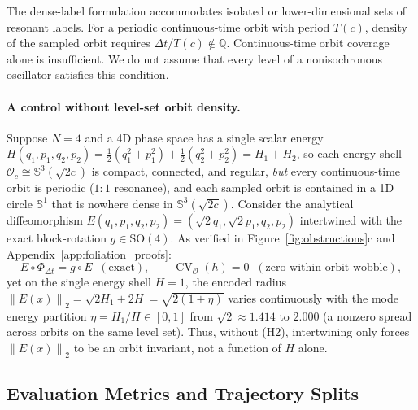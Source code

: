 \documentclass[10pt]{article}
\theoremstyle{definition}
\theoremstyle{remark}
\newcommand{\Sp}{\mathbb{S}}
\newcommand{\norm}[1]{\left\lVert #1 \right\rVert}
\DeclareMathOperator{\CV}{CV}
\begin{document}
The dense-label formulation accommodates isolated or lower-dimensional sets of resonant labels. For a periodic continuous-time orbit with period $T(c)$, density of the sampled orbit requires $\Delta t/T(c)\notin\mathbb Q$. Continuous-time orbit coverage alone is insufficient. We do not assume that every level of a nonisochronous oscillator satisfies this condition.

\paragraph{A control without level-set orbit density.}
Suppose $N = 4$ and a 4D phase space has a single scalar energy $H(q_1, p_1, q_2, p_2) = \frac{1}{2}(q_1^2 + p_1^2) + \frac{1}{2}(q_2^2 + p_2^2) = H_1 + H_2$, so each energy shell $\mathcal{O}_c \cong \Sp^3(\sqrt{2c})$ is compact, connected, and regular, \emph{but} every continuous-time orbit is periodic ($1:1$ resonance), and each sampled orbit is contained in a 1D circle $\Sp^1$ that is nowhere dense in $\Sp^3(\sqrt{2c})$. Consider the analytical diffeomorphism $E(q_1, p_1, q_2, p_2) = (\sqrt{2}q_1, \sqrt{2}p_1, q_2, p_2)$ intertwined with the exact block-rotation $g \in \mathrm{SO}(4)$. As verified in Figure~\ref{fig:obstructions}c and Appendix~\ref{app:foliation_proofs}:
\begin{equation}
    E \circ \Phi_{\Delta t} = g \circ E \;\; (\text{exact}), \qquad \CV_{\mathcal{O}}(h) = 0 \;\; (\text{zero within-orbit wobble}),
\end{equation}
yet on the single energy shell $H = 1$, the encoded radius $\norm{E(x)}_2 = \sqrt{2 H_1 + 2 H} = \sqrt{2(1 + \eta)}$ varies continuously with the mode energy partition $\eta = H_1 / H \in [0, 1]$ from $\sqrt{2} \approx 1.414$ to $2.000$ (a nonzero spread across orbits on the same level set). Thus, without (H2), intertwining only forces $\norm{E(x)}_2$ to be an orbit invariant, not a function of $H$ alone.

\subsection{Evaluation Metrics and Trajectory Splits}
\label{sec:metrics}
\end{document}
